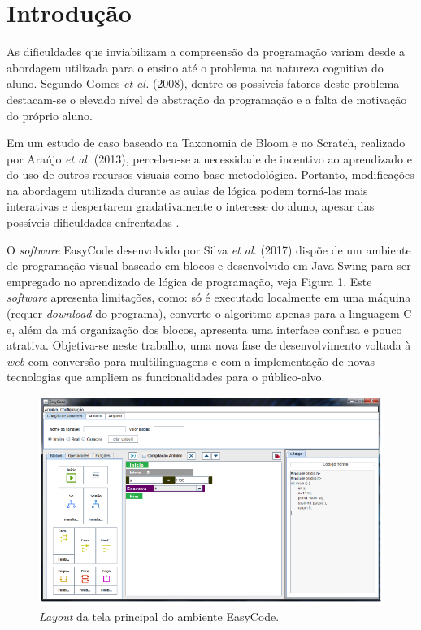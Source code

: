 \documentclass[12pt]{article}
\begin{document}
\section{Introdução} 
As dificuldades que inviabilizam a compreensão da programação variam desde a abordagem utilizada para o ensino até o problema na natureza cognitiva do aluno. Segundo Gomes \textit{et al.} (2008), dentre os possíveis fatores deste problema destacam-se o elevado nível de abstração da programação e a falta de motivação do próprio aluno. 
\par Em um estudo de caso baseado na Taxonomia de Bloom e no Scratch, realizado por Araújo \textit{et al.} (2013), percebeu-se a necessidade de incentivo ao aprendizado e do uso de outros recursos visuais como base metodológica. Portanto, modificações na abordagem utilizada durante as aulas de lógica podem torná-las mais interativas e despertarem gradativamente o interesse do aluno, apesar das possíveis dificuldades enfrentadas \cite{SILVA:2017}.
\par O \textit{software} EasyCode desenvolvido por Silva \textit{et al.} (2017) dispõe de um ambiente de programação visual baseado em blocos e desenvolvido em Java Swing para ser empregado no aprendizado de lógica de programação, veja Figura 1. Este \textit{software} apresenta limitações, como: só é executado localmente em uma máquina (requer \textit{download} do programa), converte o algoritmo apenas para a linguagem C e, além da má organização dos blocos, apresenta uma interface confusa e pouco atrativa. Objetiva-se neste trabalho, uma nova fase de desenvolvimento voltada à \textit{web} com conversão para multilinguagens e com a implementação de novas tecnologias que ampliem as funcionalidades para o público-alvo.
	\begin{figure}[h]
		\centering
		\includegraphics[scale=0.5]{2017.png}
		\caption{\textit{Layout} da tela principal do ambiente EasyCode.}
		\label{fig1}
	\end{figure}
\end{document}
